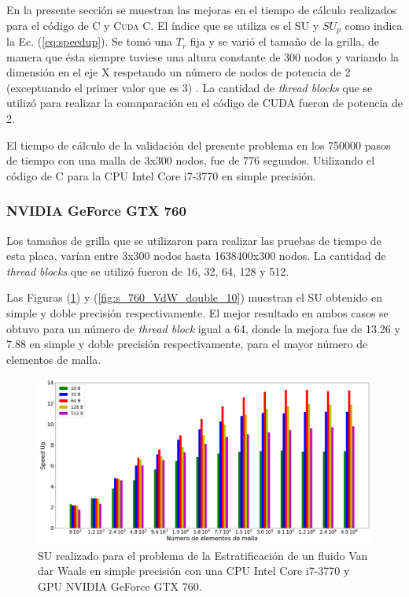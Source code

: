 En la presente sección se muestran las mejoras en el tiempo de cálculo realizados para el código de \textsc{C} y \textsc{Cuda C}. El índice que se utiliza es el SU y $SU_p$ como indica la Ec. (\ref{eq:speedup}). Se tomó una $T_r$ fija y se varió el tamaño de la grilla, de manera que ésta siempre tuviese una altura constante de 300 nodos y variando la dimensión en el eje \textsc{X} respetando un número de nodos de potencia de 2 (exceptuando el primer valor que es 3) . La cantidad de \textit{thread blocks} que se utilizó para realizar la comnparación en el código de \textsc{CUDA} fueron de potencia de 2.

El tiempo de cálculo de la validación del presente problema en los 750000 pasos de tiempo con una malla de 3x300 nodos, fue de 776 segundos. Utilizando  el código de \textsc{C} para la CPU Intel Core i7-3770 en simple precisión.

\subsubsection{NVIDIA GeForce GTX 760}

Los tamaños de grilla que se utilizaron para realizar las pruebas de tiempo de esta placa, varían entre 3x300 nodos hasta 1638400x300 nodos. La cantidad de \textit{thread blocks} que se utilizó fueron de 16, 32, 64, 128 y 512.

Las Figuras (\ref{fig:s_760_VdW_simple_10}) y (\ref{fig:s_760_VdW_double_10}) muestran el SU obtenido en simple y doble precisión respectivamente. El mejor resultado en ambos casos se obtuvo para un número de \textit{thread block} igual a 64, donde la mejora fue de 13.26 y 7.88 en simple y doble precisión respectivamente, para el mayor número de elementos de malla.





\begin{figure}[htbp]
	\centering
	\includegraphics[width=\textwidth]{figs_2/cap4/s_760_VdW_simple_10}
	\caption{SU realizado para el problema de la Estratificación de un fluido Van dar Waals en simple precisión con una CPU Intel Core i7-3770 y GPU NVIDIA GeForce GTX 760.} 
	\label{fig:s_760_VdW_simple_10}	
\end{figure}

